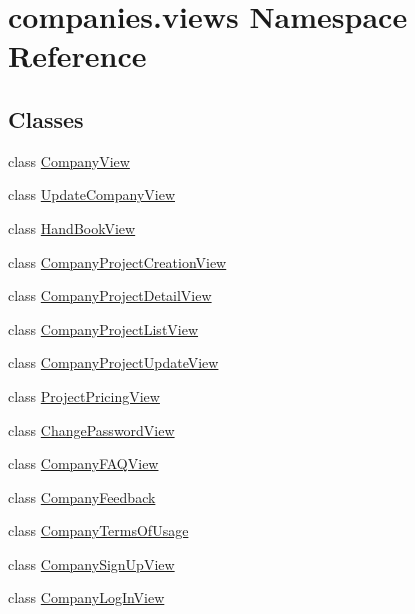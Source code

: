 \hypertarget{namespacecompanies_1_1views}{\section{companies.\-views Namespace Reference}
\label{namespacecompanies_1_1views}
}
\subsection*{Classes}
\begin{DoxyCompactItemize}
\item 
class \hyperlink{classcompanies_1_1views_1_1_company_view}{Company\-View}
\item 
class \hyperlink{classcompanies_1_1views_1_1_update_company_view}{Update\-Company\-View}
\item 
class \hyperlink{classcompanies_1_1views_1_1_hand_book_view}{Hand\-Book\-View}
\item 
class \hyperlink{classcompanies_1_1views_1_1_company_project_creation_view}{Company\-Project\-Creation\-View}
\item 
class \hyperlink{classcompanies_1_1views_1_1_company_project_detail_view}{Company\-Project\-Detail\-View}
\item 
class \hyperlink{classcompanies_1_1views_1_1_company_project_list_view}{Company\-Project\-List\-View}
\item 
class \hyperlink{classcompanies_1_1views_1_1_company_project_update_view}{Company\-Project\-Update\-View}
\item 
class \hyperlink{classcompanies_1_1views_1_1_project_pricing_view}{Project\-Pricing\-View}
\item 
class \hyperlink{classcompanies_1_1views_1_1_change_password_view}{Change\-Password\-View}
\item 
class \hyperlink{classcompanies_1_1views_1_1_company_f_a_q_view}{Company\-F\-A\-Q\-View}
\item 
class \hyperlink{classcompanies_1_1views_1_1_company_feedback}{Company\-Feedback}
\item 
class \hyperlink{classcompanies_1_1views_1_1_company_terms_of_usage}{Company\-Terms\-Of\-Usage}
\item 
class \hyperlink{classcompanies_1_1views_1_1_company_sign_up_view}{Company\-Sign\-Up\-View}
\item 
class \hyperlink{classcompanies_1_1views_1_1_company_log_in_view}{Company\-Log\-In\-View}
\end{DoxyCompactItemize}
